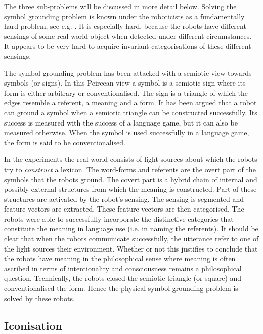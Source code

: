 The three sub-problems will be discussed in more detail below. Solving the symbol grounding problem is known under the roboticists as a fundamentally hard problem, see e.g. \citep{pfeiferscheier:1999}. It is especially hard, because the robots have different sensings of some real world object when detected under different circumstances. It appears to be very hard to acquire invariant categorisations of these different sensings.

The symbol grounding problem has been attacked with a semiotic view towards symbols (or signs). In this Peircean view a symbol is a semiotic sign where its form is either arbitrary or conventionalised. The sign is a triangle of which the edges resemble a referent, a meaning and a form. It has been argued that a robot can ground a symbol when a semiotic triangle can be constructed successfully. Its success is measured with the success of a language game, but it can also be measured otherwise. When the symbol is used successfully in a language game, the form is said to be conventionalised.


In the experiments the real world consists of light sources about which the robots try to {\em construct} a lexicon. The word-forms and referents are the overt part of the symbols that the robots ground. The covert part is a hybrid chain of internal and possibly external structures from which the meaning is constructed. Part of these structures are activated by the robot's sensing. The sensing is segmented and feature vectors are extracted. These feature vectors are then categorised. The robots were able to successfully incorporate the distinctive categories that constitute the meaning in language use (i.e. in naming the referents). It should be clear that when the robots communicate successfully, the utterance refer to one of the light sources their environment. Whether or not this justifies to conclude that the robots have meaning in the philosophical sense where meaning is often ascribed in terms of intentionality and consciousness remains a philosophical question. Technically, the robots closed the semiotic triangle (or square) and conventionalised the form. Hence the physical symbol grounding problem is solved by these robots.


\subsection{Iconisation}

